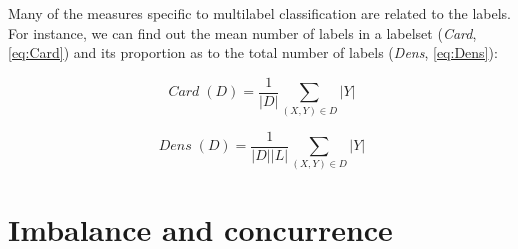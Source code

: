 \documentclass[]{article}
\newcommand{\func}[1]{\operatorname{\mathit{#1}}} \newcommand{\const}[1]{\mathit{#1}} \newcommand{\abs}[1]{\left\lvert{#1}\right\rvert}
\begin{document}
Many of the measures specific to multilabel classification are related
to the labels. For instance, we can find out the mean number of labels
in a labelset (\emph{Card}, \ref{eq:Card}) and its proportion as to the
total number of labels (\emph{Dens}, \ref{eq:Dens}):

\begin{equation} \func{Card}(D) = \frac 1 {\abs D} \sum_{(X,Y)\in D} \abs Y \label{eq:Card}\end{equation}

\begin{equation} \func{Dens}(D) = \frac 1 {\abs D \abs L} \sum_{(X,Y)\in D} \abs Y \label{eq:Dens}\end{equation}

\section{Imbalance and concurrence}\label{imbalance-and-concurrence}
\end{document}
